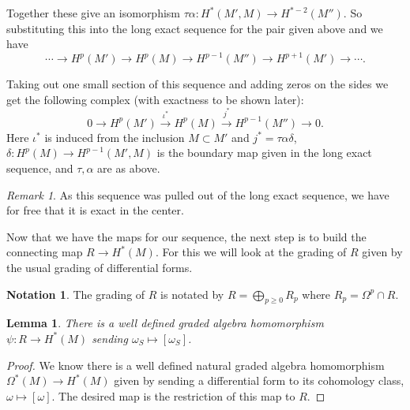 \documentclass[article,twoside]{article}
\theoremstyle{plain}
\theoremstyle{plain}
\newtheorem{lemma}[lemma]{Lemma}
\theoremstyle{plain}
\theoremstyle{plain}
\theoremstyle{plain}
\theoremstyle{definition}
\theoremstyle{definition}
\newtheorem{notation}[notation]{Notation}
\theoremstyle{definition}
\theoremstyle{remark}
\theoremstyle{remark}
\newtheorem{remark}[remark]{Remark}
\begin{document}
Together these give an isomorphism $\tau\alpha:H^*(M',M)\to H^{*-2}(M'')$. So substituting this into the long exact sequence for the pair given above and we have
$$
\cdots \to H^p(M') \to H^p(M) \to H^{p-1}(M'') \to H^{p+1}(M') \to \cdots.
$$

Taking out one small section of this sequence and adding zeros on the sides we get the following complex (with exactness to be shown later):
$$
	0\to H^p(M') \overset{\iota^*}{\rightarrow} H^p(M) \overset{j^*}{\rightarrow} H^{p-1}(M'') \to 0.
$$
Here $\iota^*$ is induced from the inclusion $M\subset M'$ and $j^* = \tau\alpha\delta$, $\delta:H^p(M)\to H^{p-1}(M',M)$ is the boundary map given in the long exact sequence, and $\tau,\alpha$ are as above.

\begin{remark}\label{cohom_exact_center}
	As this sequence was pulled out of the long exact sequence, we have for free that it is exact in the center.
\end{remark}




Now that we have the maps for our sequence, the next step is to build the connecting map $R\to H^*(M)$. For this we will look at the grading of $R$ given by the usual grading of differential forms.

\begin{notation}
	The grading of $R$ is notated by $R=\bigoplus_{p\geq 0}R_p$ where $R_p=\Omega^p\cap R$.
\end{notation}

\begin{lemma}\label{alg_hom_R_to_H*(M)}
	There is a well defined graded algebra homomorphism $\psi: R\to H^*(M)$ sending $\omega_S\mapsto[\omega_S]$.
\end{lemma}
\begin{proof}
	We know there is a well defined natural graded algebra homomorphism $\Omega^*(M)\to H^*(M)$ given by sending a differential form to its cohomology class, $\omega\mapsto[\omega]$. The desired map is the restriction of this map to $R$.
\end{proof}



\end{document}
